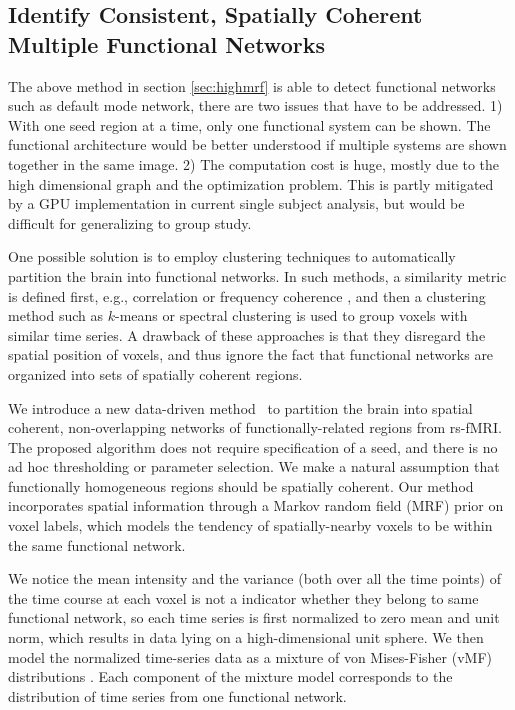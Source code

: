 \documentclass[12pt]{article}
\begin{document}
\subsection{Identify Consistent, Spatially Coherent Multiple Functional Networks}

The above method in section \ref{sec:highmrf} is able to detect functional
networks such as default mode network, there are two issues that have to be
addressed. 1) With one seed region at a time, only one functional system can be
shown. The functional architecture would be better understood if multiple
systems are shown together in the same image. 2) The computation cost is huge,
mostly due to the high dimensional graph and the optimization problem.  This is
partly mitigated by a GPU implementation in current single subject analysis, but
would be difficult for generalizing to group study.

One possible solution is to employ clustering techniques to automatically
partition the brain into functional networks. In such methods, a similarity
metric is defined first, e.g., correlation \cite{5074650} or frequency coherence
\cite{thirion2006detection}, and then a clustering method such as $k$-means or
spectral clustering is used to group voxels with similar time series. A drawback
of these approaches is that they disregard the spatial position of voxels, and
thus ignore the fact that functional networks are organized into sets of
spatially coherent regions.

We introduce a new data-driven method~\cite{liu2011monteCopy} to partition the brain
into spatial coherent, non-overlapping networks of functionally-related regions
from rs-fMRI. The proposed algorithm does not require specification of a seed,
and there is no ad hoc thresholding or parameter selection. We make a natural
assumption that functionally homogeneous regions should be spatially
coherent. Our method incorporates spatial information through a Markov random
field (MRF) prior on voxel labels, which models the tendency of spatially-nearby
voxels to be within the same functional network.

We notice the mean intensity and the variance (both over all the time points) of
the time course at each voxel is not a indicator whether they belong to same
functional network, so each time series is first normalized to zero mean and unit
norm, which results in data lying on a high-dimensional unit sphere. We then
model the normalized time-series data as a mixture of von Mises-Fisher (vMF)
distributions \cite{banerjee2006clustering}. Each component of the mixture model
corresponds to the distribution of time series from one functional network.
\end{document}
